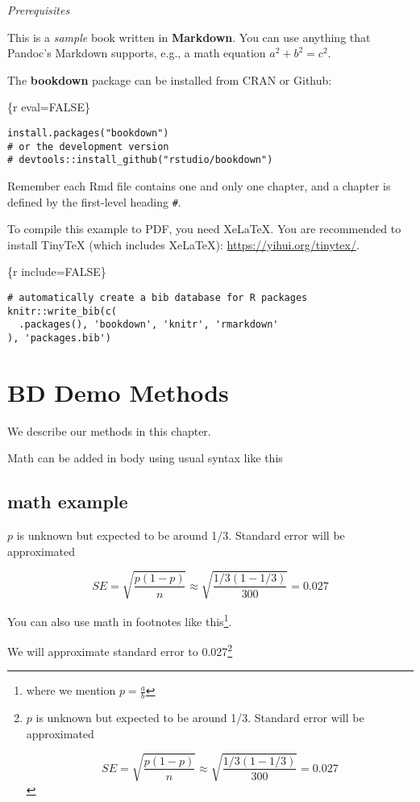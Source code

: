 \documentclass[
]{book}
\begin{document}
\emph{Prerequisites}

This is a \emph{sample} book written in \textbf{Markdown}. You can use anything that Pandoc's Markdown supports, e.g., a math equation \(a^2 + b^2 = c^2\).

The \textbf{bookdown} package can be installed from CRAN or Github:

\{r eval=FALSE\}

\begin{verbatim}
install.packages("bookdown")
# or the development version
# devtools::install_github("rstudio/bookdown")
\end{verbatim}

Remember each Rmd file contains one and only one chapter, and a chapter is defined by the first-level heading \texttt{\#}.

To compile this example to PDF, you need XeLaTeX. You are recommended to install TinyTeX (which includes XeLaTeX): \url{https://yihui.org/tinytex/}.

\{r include=FALSE\}

\begin{verbatim}
# automatically create a bib database for R packages
knitr::write_bib(c(
  .packages(), 'bookdown', 'knitr', 'rmarkdown'
), 'packages.bib')
\end{verbatim}

\chapter{BD Demo Methods}\label{bd-demo-methods}

We describe our methods in this chapter.

Math can be added in body using usual syntax like this

\section{math example}\label{math-example}

\(p\) is unknown but expected to be around 1/3. Standard error will be approximated

\[
SE = \sqrt{\frac{p(1-p)}{n}} \approx \sqrt{\frac{1/3 (1 - 1/3)} {300}} = 0.027
\]

You can also use math in footnotes like this\footnote{where we mention \(p = \frac{a}{b}\)}.

We will approximate standard error to 0.027\footnote{\(p\) is unknown but expected to be around 1/3. Standard error will be approximated

  \[
  SE = \sqrt{\frac{p(1-p)}{n}} \approx \sqrt{\frac{1/3 (1 - 1/3)} {300}} = 0.027
  \]}

  
\end{document}
